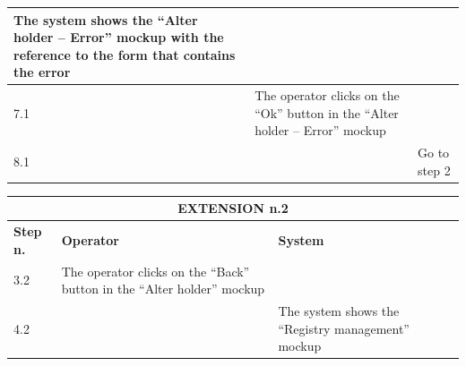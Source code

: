 {{{\begin{table}[h]
\begin{tabular}{|p{2cm}|p{6cm}|p{6cm}|}
				\vspace{1mm} The system shows the “Alter holder – Error”  mockup with the reference to the form that contains the error \vspace{1mm} \\
			\hline
				\vspace{1mm} 7.1 \vspace{1mm} &
				\vspace{1mm} The operator clicks on the “Ok” button in the “Alter holder – Error”  mockup \vspace{1mm} & 
				\vspace{1mm} \vspace{1mm} \\
			\hline
				\vspace{1mm} 8.1 \vspace{1mm} &
				\vspace{1mm} \vspace{1mm} & 
				\vspace{1mm} Go to step 2\vspace{1mm} \\
			\hline
			\end{tabular}
			\end{table}
			\begin{table}[h]
			\begin{tabular}{|p{2cm}|p{6cm}|p{6cm}|}
			\hline
				\multicolumn{3}{|c|}{EXTENSION n.2} \\
			\hline
				\centering \vspace{1mm} \bfseries{Step n.} \vspace{1mm} & \vspace{1mm} \bfseries{Operator} \vspace{1mm} & \vspace{1mm} \bfseries{System} \vspace{1mm}\\
			\hline
				\vspace{1mm} 3.2 \vspace{1mm} &
				\vspace{1mm} The operator clicks on the “Back” button in the “Alter holder”  mockup \vspace{1mm} & 
				\vspace{1mm} \vspace{1mm} \\
			\hline
				\vspace{1mm} 4.2 \vspace{1mm} &
				\vspace{1mm} \vspace{1mm} & 
				\vspace{1mm} The system shows the “Registry management” mockup \vspace{1mm} \\
			\hline
			\end{tabular}
			\end{table}
			
}}}
